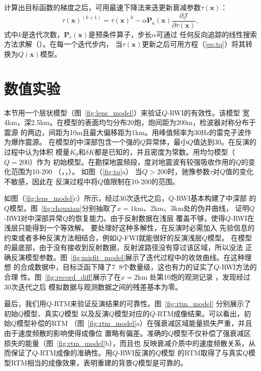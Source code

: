 计算出目标函数的梯度之后，可用最速下降法来迭更新衰减参数$\tau(\mathbf{x})$：
\begin{equation}
    \tau(\mathbf{x})^{(k+1)}=\tau(\mathbf{x})^k-\alpha \mathbf{P_c}(\mathbf{x})
    \frac{\partial \mathcal{J}}{\partial \tau(\mathbf{x})},
\end{equation}
式中$k$是迭代次数，$\mathbf{P}_c(\mathbf{x})$是预条件算子，步长$\alpha$可通过
任何反向追踪的线性搜索方法求解（）。在每一个迭代步内，
当$\tau(\mathbf{x})$更新之后可用方程（\ref{eq:tq}）将其转换为$Q(\mathbf{x})$模型。


\newpage
\section{数值实验}
本节用一个层状模型（图~\ref{fig:lens_model}）来验证$Q$-RWI的有效性。该模型
宽4km，深2.5km。在模型的表面均匀分布20炮，炮间距为200m，检波器对称分布于震源
的两边，间距为10m且最大偏移距为1km。用峰值频率为30Hz的雷克子波作为爆炸震源。
在模型的中深部包含一个强的$Q$异常体，最小$Q$值达到30。在反演的过程中认为体积
模量$K_0$和$\delta K$都是已知的，并且密度为常数。用均匀模型（$Q=200$）作为
初始模型。在勘探地震频段，度对地震波有较强吸收作用的$Q$的变化范围为10-200
（，，）。
如图（\ref{fig:tq}a）
当$Q>200$时，驰豫参数$\tau$对$Q$值的变化不敏感，因此在
反演过程中将$Q$值限制在10-200的范围。

如图（\ref{fig:lens_model}c）所示，经过30次迭代之后，$Q$-RWI基本构建了中深部
的$Q$模型。图~\ref{fig:chouxian}分别抽取了$x=1$km、2km、3km处的伪井曲线，
证明$Q$-RWI对中深部异常$Q$的恢复能力。由于反射数据在浅层
覆盖不够，使得$Q$-RWI在浅层只能得到一个等效解。
要处理好这种多解性，在反演时必需加入
先验信息的约束或者多种反演方法相结合，例如$Q$-FWI就能很好的反演浅层$Q$模型。
在模型的最底部，由于没有接收到反射数据，反射波路径没有穿过该区域，所以没法
正确反演模型参数。图~\ref{fig:misfit_model}展示了迭代过程中的收敛曲线。在这种理想
的合成数据中，目标泛函下降了7~8个数量级，这也有力的证实了$Q$-RWI方法的合理
性。图~\ref{fig:record_diff}展示了在$x=2$km 处第10炮的观测记录
，发现经过30次迭代之后
模拟数据与观测数据之间的残差基本为零。

最后，我们用$Q$-RTM来验证反演结果的可靠性。图~\ref{fig:rtm_model}
分别展示了初始$Q$模型、真实$Q$模型
以及反演$Q$模型对应的$Q$-RTM成像结果。可以看出，初始$Q$模型补偿的RTM
（图~\ref{fig:rtm_model}a）在强衰减区域能量损失严重，并且由于速度频散的影响使得成像位
置略有偏差。准确的$Q$模型不仅补偿了强衰减区损失的能量（图~\ref{fig:rtm_model}b），而且也
反映衰减介质中的速度频散关系，从而保证了$Q$-RTM成像的准确性。用$Q$-RWI反演的$Q$模型
的RTM取得了与真实$Q$模型RTM相当的成像效果，表明重建的背景$Q$模型是可靠的。

